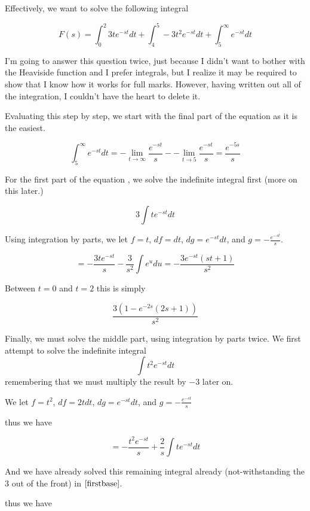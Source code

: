 \documentclass{article}
\begin{document}
Effectively, we want to solve the following integral

$$F(s) = \int_{0}^{2} 3t e^{-st} dt  + \int_{4}^{5} -3t^2 e^{-st} dt + \int_{5}^{\infty} e^{-st} dt$$

I'm going to answer this question twice, just because I didn't want to bother with the Heaviside function and I prefer integrals, but I realize it may be required to show that I know how it works for full marks. However, having written out all of the integration, I couldn't have the heart to delete it.


Evaluating this step by step, we start with the final part of the equation as it is the easiest.

\begin{equation}\label{last}
\int_{5}^{\infty} e^{-st} dt = - \lim_{t \to \infty} \frac{e^{-st}}{s} - - \lim_{t \to 5} \frac{e^{-st}}{s} = \frac{e^{-5s}}{s}
\end{equation}

For the first part of the equation , we solve the indefinite integral first (more on this later.)

$$3\int t e^{-st} dt$$

Using integration by parts, we let $f=t$, $df=dt$, $dg=e^{-st}dt$, and $g=-\frac{e^{-st}}{s}$.

\begin{equation}\label{firstbase}
 = -\frac{3te^{-st}}{s}-\frac{3}{s^2}\int e^u du = -\frac{3e^{-st}(st+1)}{s^2}
\end{equation}

Between $t=0$ and $t=2$ this is simply

\begin{equation}\label{first}
\frac{3(1-e^{-2s}(2s+1))}{s^2}
\end{equation}


Finally, we must solve the middle part, using integration by parts twice.
We first attempt to solve the indefinite integral
$$\int t^2 e^{-st} dt$$
remembering that we must multiply the result by $-3$ later on.

We let $f=t^2$, $df=2tdt$, $dg=e^{-st}dt$, and $g=-\frac{e^{-st}}{s}$

thus we have

$$=-\frac{t^2e^{-st}}{s}+\frac{2}{s} \int t e^{-st} dt$$

And we have already solved this remaining integral already (not-withstanding the $3$ out of the front) in $\eqref{firstbase}$.

thus we have
\end{document}
